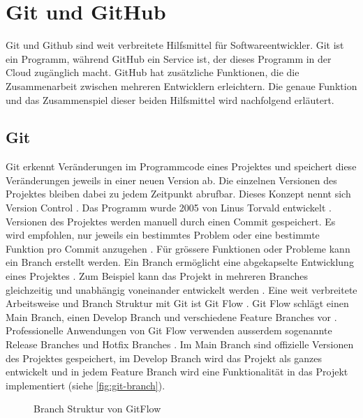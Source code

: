 \section{Git und GitHub}\label{chap:t_git} Git und Github sind weit verbreitete
Hilfsmittel für Softwareentwickler. Git ist ein Programm, während GitHub ein
Service ist, der dieses Programm in der Cloud zugänglich macht. GitHub hat
zusätzliche Funktionen, die die Zusammenarbeit zwischen mehreren Entwicklern
erleichtern. Die genaue Funktion und das Zusammenspiel dieser beiden Hilfsmittel
wird nachfolgend erläutert.
 
\subsection{Git}\label{sub:t_git_git} Git erkennt Veränderungen im Programmcode eines
Projektes und speichert diese Veränderungen jeweils in einer neuen Version ab. Die
einzelnen Versionen des Projektes bleiben dabei zu jedem Zeitpunkt abrufbar.
Dieses Konzept nennt sich Version Control
\cite{atlassian_what_nodate}. Das Programm wurde 2005 von Linus
Torvald entwickelt \cite{noauthor_git_2021}. Versionen des Projektes werden
manuell durch einen Commit gespeichert. Es wird empfohlen, nur jeweils ein
bestimmtes Problem oder eine bestimmte Funktion pro Commit anzugehen
\cite{noauthor_5_2019}. Für grössere Funktionen oder Probleme kann ein Branch
erstellt werden. Ein Branch ermöglicht eine abgekapselte Entwicklung eines
Projektes \cite{guillermo_brachetta_what_2022}. Zum Beispiel kann das Projekt in
mehreren Branches gleichzeitig und unabhängig voneinander entwickelt werden
\cite{guillermo_brachetta_what_2022}. Eine weit verbreitete Arbeitsweise und
Branch Struktur mit Git ist Git Flow
\cite{noauthor_what_2022}\cite{atlassian_git-flow-workflow_nodate}. Git Flow
schlägt einen Main Branch, einen Develop Branch und verschiedene
Feature Branches vor \cite{atlassian_git-flow-workflow_nodate}. Professionelle
Anwendungen von Git Flow verwenden ausserdem sogenannte Release Branches und
Hotfix Branches \cite{cameron_mckenzie_gitflow_2021}. Im Main Branch sind
offizielle Versionen des Projektes gespeichert, im Develop Branch wird das
Projekt als ganzes entwickelt und in jedem Feature Branch wird eine
Funktionalität in das Projekt implementiert (siehe \autoref{fig:git-branch}).
 
\begin{figure}[!ht]
   \centering
   \caption{Branch Struktur von GitFlow \cite{atlassian_git-flow-workflow_nodate}}\label{fig:git-branch}
\end{figure}
 
